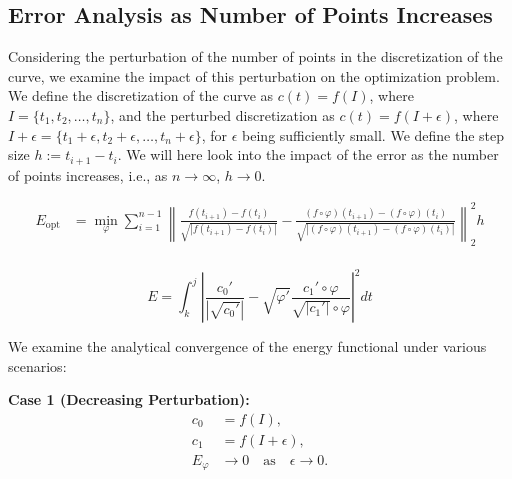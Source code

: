 \subsection{Error Analysis as Number of Points Increases}

Considering the perturbation of the number of points in the discretization of the curve, we examine the impact of this perturbation on the optimization problem. We define the discretization of the curve as $c(t) = f(I)$, where $I = \{t_1, t_2, \ldots, t_n\}$, and the perturbed discretization as $c(t) = f(I + \epsilon)$, where $I + \epsilon = \{t_1 + \epsilon, t_2 + \epsilon, \ldots, t_n + \epsilon\}$, for $\epsilon$ being sufficiently small. We define the step size \(h := t_{i+1} - t_i\). We will here look into the impact of the error as the number of points increases, i.e., as \(n \rightarrow \infty\), \(h \rightarrow 0\). 

\begin{equation}
    \begin{aligned}
        E_{\mathrm{opt}} 
        &= \min_{\varphi} \sum_{i=1}^{n-1} \left\| \frac{f(t_{i+1}) - f(t_i)}{\sqrt{|f(t_{i+1}) - f(t_i)|}} - \frac{(f \circ \varphi)(t_{i+1}) - (f \circ \varphi)(t_i)}{\sqrt{|(f \circ \varphi)(t_{i+1}) - (f \circ \varphi)(t_i)|}} \right\|_2^2 h \\ 
    \end{aligned}
\end{equation}
















\begin{equation*}
    E = \int_k^j | \frac{c_0'}{|\sqrt{c_0'}|} - \sqrt{\varphi'} \frac{c_1' \circ \varphi}{\sqrt{|c_1' |} \circ \varphi} |^2 dt
\end{equation*}

We examine the analytical convergence of the energy functional under various scenarios:

\textbf{Case 1 (Decreasing Perturbation):}
\begin{align*}
    c_0 &= f(I), \\
    c_1 &= f(I + \epsilon), \\
    E_{\varphi} &\rightarrow 0 \quad \text{as} \quad \epsilon \rightarrow 0.
\end{align*}

